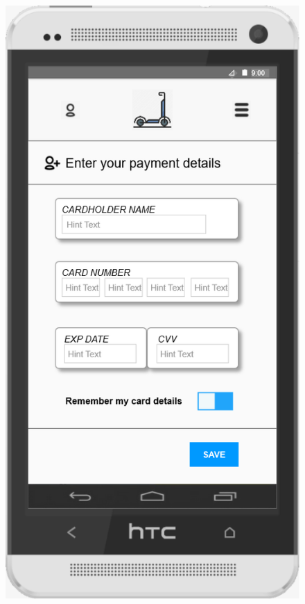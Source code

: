 \documentclass[a4paper, 12pt]{article}
\begin{document}
\begin{figure} [htbp]
    \begin{center}
        \begin{minipage}{0.45\textwidth}
            \begin{center}
                \includegraphics[scale=0.65]{images/prototypes/02-02-01-01-menu-dropdown--payment-information--payment-methods--credit-debit-card-info.png}

\end{center}
\end{minipage}
\end{center}
\end{figure}
\end{document}
